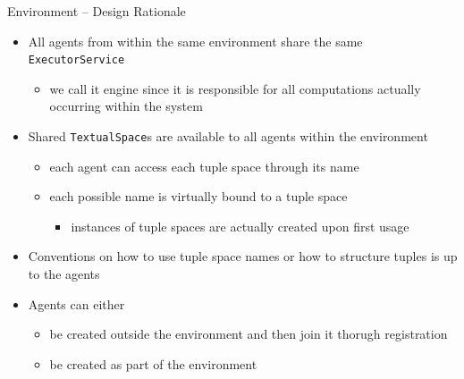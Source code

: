 \documentclass[presentation]{beamer}\mode<presentation>{\usetheme{AMSCesenaPurpleAndGold}}
\begin{document}
\begin{frame}{Environment -- Design Rationale}
    
    \begin{itemize}
        \item All agents from within the same environment \alert{share} the same \texttt{ExecutorService}
        \begin{itemize}
            \item we call it \alert{engine} since it is responsible for all computations actually occurring within the system
        \end{itemize}
        
        \vfill
        
        \item Shared \texttt{TextualSpace}s are available \alert{to all agents} within the environment
        \begin{itemize}
            \item each agent can access each tuple space through its \alert{name}
            \item each possible name is \alert{virtually} bound to a tuple space
            \begin{itemize}
                \item instances of tuple spaces are \alert{actually created} upon first usage
            \end{itemize}
        \end{itemize}
        
        \vfill
        
        \item Conventions on how to use tuple space names or how to structure tuples is up to the agents
        
        \vfill
        
        \item Agents can either
        \begin{itemize}
            \item be created outside the environment and then join it thorugh \alert{registration}
            \item be created as part of the environment
        \end{itemize}
        
    \end{itemize}
    
\end{frame}
\end{document}
